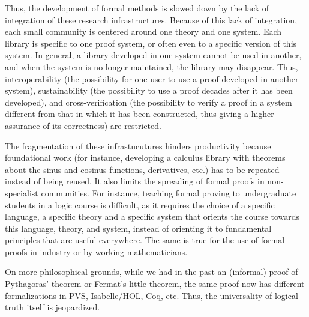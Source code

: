 Thus, the development of formal methods is slowed down by the lack of
integration of these research infrastructures.  Because of this lack
of integration, each small community is centered around one theory and
one system. Each library is specific to one proof system, or often
even to a specific version of this system. In general, a library
developed in one system cannot be used in another, and when the system
is no longer maintained, the library may disappear.  Thus,
interoperability (the possibility for one user to use a proof
developed in another system), sustainability (the possibility to use a
proof decades after it has been developed), and cross-verification
(the possibility to verify a proof in a system different from that in
which it has been constructed, thus giving a higher assurance of its
correctness) are restricted.

The fragmentation of these infrastucutures hinders productivity
because foundational work (for instance, developing a calculus library
with theorems about the sinus and cosinus functions, derivatives,
etc.) has to be repeated instead of being reused.  It also limits the
spreading of formal proofs in non-specialist communities. For
instance, teaching formal proving to undergraduate students in a logic
course is difficult, as it requires the choice of a specific language,
a specific theory and a specific system that orients the course
towards this language, theory, and system, instead of orienting it to
fundamental principles that are useful everywhere. The same is true
for the use of formal proofs in industry or by working mathematicians.

On more philosophical grounds, while we had in the past an (informal)
proof of Pythagoras' theorem or Fermat's little theorem, the same
proof now has different formalizations in PVS, Isabelle/HOL, Coq, etc.
Thus, the universality of logical truth itself is jeopardized.

